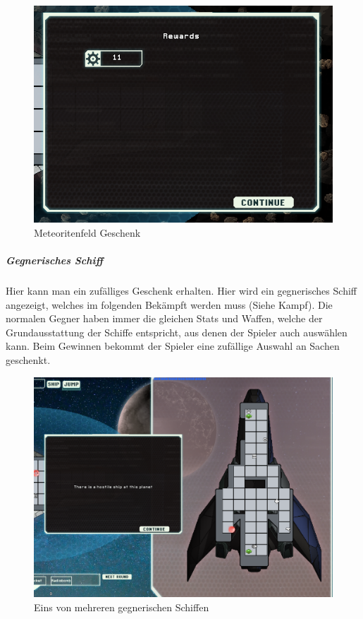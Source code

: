 \documentclass[fontsize=12pt,paper=a4,twoside]{scrartcl}
\begin{document}
\begin{figure}[H]
\centering
\includegraphics[width=1\linewidth]{DasSpiel/Karte/meteorPresent.png}
\caption{Meteoritenfeld Geschenk}
\end{figure} 



\subparagraph{Gegnerisches Schiff} Hier kann man ein zufälliges Geschenk erhalten. Hier wird ein gegnerisches Schiff angezeigt, welches im folgenden Bekämpft werden muss (Siehe Kampf). Die normalen Gegner haben immer die gleichen Stats und Waffen, welche der Grundausstattung der Schiffe entspricht, aus denen der Spieler auch auswählen kann. Beim Gewinnen bekommt der Spieler eine zufällige Auswahl an Sachen geschenkt. 

\begin{figure}[H]
\centering
\includegraphics[width=1\linewidth]{DasSpiel/Karte/enemy.png}
\caption{Eins von mehreren gegnerischen Schiffen}
\end{figure} 
\end{document}
